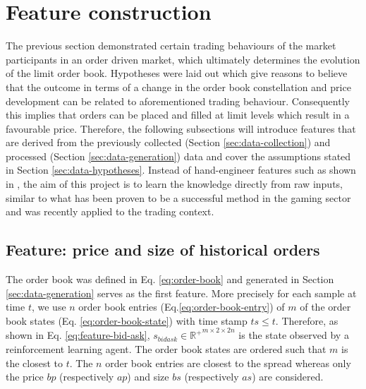 \section{Feature construction}
\label{sec:feature-engineering}
The previous section demonstrated certain trading behaviours of the market participants in an order driven market, which ultimately determines the evolution of the limit order book. 
Hypotheses were laid out which give reasons to believe that the outcome in terms of a change in the order book constellation and price development can be related to aforementioned trading behaviour.
Consequently this implies that orders can be placed and filled at limit levels which result in a favourable price.
Therefore, the following subsections will introduce features that are derived from the previously collected (Section \ref{sec:data-collection}) and processed (Section \ref{sec:data-generation}) data and cover the assumptions stated in Section \ref{sec:data-hypotheses}.
Instead of hand-engineer features such as shown in \cite{nevmyvaka2006reinforcement, hwangdeep, fletcher2010multiple}, the aim of this project is to learn the knowledge directly from raw inputs, similar to what has been proven to be a successful method in the gaming sector\cite{mnih2013playing} and was recently applied to the trading context\cite{lu2017agent}.

\subsection{Feature: price and size of historical orders}
The order book was defined in Eq. \ref{eq:order-book} and generated in Section \ref{sec:data-generation} serves as the first feature.
More precisely for each sample at time $t$, we use $n$ order book entries (Eq.\ref{eq:order-book-entry}) of $m$ of the order book states (Eq. \ref{eq:order-book-state}) with time stamp $ts \le t$.
Therefore, as shown in Eq. \ref{eq:feature-bid-ask}, $s_{bidask} \in \mathbb{R^+}^{m\times2\times2n}$ is the state observed by a reinforcement learning agent.
The order book states are ordered such that $m$ is the closest to $t$.
The $n$ order book entries are closest to the spread whereas only the price $bp$ (respectively $ap$) and size $bs$ (respectively $as$) are considered.

